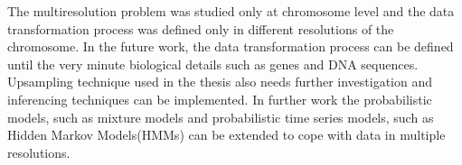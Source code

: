 The multiresolution problem was studied only at chromosome level and the data transformation process was defined only in different resolutions of the chromosome. In the future work, the data transformation process can be defined until the very minute biological details such as genes and DNA sequences. Upsampling technique used in the thesis also needs further investigation and inferencing techniques can be implemented. In further work the probabilistic models, such as mixture models and probabilistic time series models, such as Hidden Markov Models(HMMs) can be extended to cope with data in multiple resolutions. 